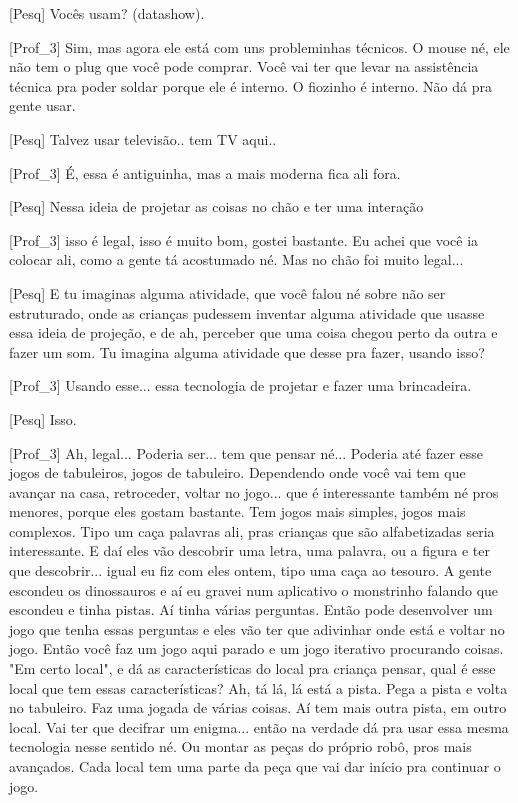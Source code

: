 [Pesq] Vocês usam? (datashow).

[Prof\_3] Sim, mas agora ele está com uns probleminhas técnicos. O mouse né, ele não tem o plug que você pode comprar. Você vai ter que levar na assistência técnica pra poder soldar porque ele é interno. O fiozinho é interno. Não dá pra gente usar. 

[Pesq] Talvez usar televisão.. tem TV aqui..

[Prof\_3] É, essa é antiguinha, mas a mais moderna fica ali fora.

[Pesq] Nessa ideia de projetar as coisas no chão e ter uma interação 

[Prof\_3] isso é legal, isso é muito bom, gostei bastante. Eu achei que você ia colocar ali, como a gente tá acostumado né. Mas no chão foi muito legal...

[Pesq] E tu imaginas alguma atividade, que você falou né sobre não ser estruturado, onde as crianças pudessem inventar alguma atividade que usasse essa ideia de projeção, e de ah, perceber que uma coisa chegou perto da outra e fazer um som. Tu imagina alguma atividade que desse pra fazer, usando isso?

[Prof\_3] Usando esse... essa tecnologia de projetar e fazer uma brincadeira. 

[Pesq] Isso.

[Prof\_3] Ah, legal... Poderia ser... tem que pensar né... Poderia até fazer esse jogos de tabuleiros, jogos de tabuleiro. Dependendo onde você vai tem que avançar na casa, retroceder, voltar no jogo... que é interessante também né pros menores, porque eles gostam bastante. Tem jogos mais simples, jogos mais complexos. Tipo um caça palavras ali, pras crianças que são alfabetizadas seria interessante. E daí eles vão descobrir uma letra, uma palavra, ou a figura e ter que descobrir... igual eu fiz com eles ontem, tipo uma caça ao tesouro. A gente escondeu os dinossauros e aí eu gravei num aplicativo o monstrinho falando que escondeu e tinha pistas. Aí tinha várias perguntas. Então pode desenvolver um jogo que tenha essas perguntas e eles vão ter que adivinhar onde está e voltar no jogo. Então você faz um jogo aqui parado e um jogo iterativo procurando coisas. "Em certo local", e dá as características do local pra criança pensar, qual é esse local que tem essas características? Ah, tá lá, lá está a pista. Pega a pista e volta no tabuleiro. Faz uma jogada de várias coisas. Aí tem mais outra pista, em outro local. Vai ter que decifrar um enigma... então na verdade dá pra usar essa mesma tecnologia nesse sentido né. Ou montar as peças do próprio robô, pros mais avançados. Cada local tem uma parte da peça que vai dar início pra continuar o jogo.

